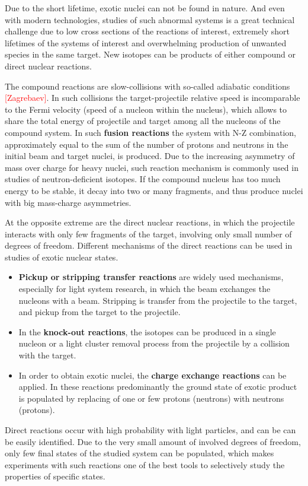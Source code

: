 Due to the short lifetime, exotic nuclei can not be found in nature.
And even with modern technologies, studies of such abnormal systems is a great technical challenge due to low cross sections of the reactions of interest, extremely short lifetimes of the systems of interest and overwhelming production of unwanted species in the same target.
New isotopes can be products of either compound or direct nuclear reactions.

The compound reactions are slow-collisions with so-called adiabatic conditions \textcolor{red}{[Zagrebaev]}.
In such collisions the target-projectile relative speed is incomparable to the Fermi velocity (speed of a nucleon within the nucleus), which allows to share the total energy of projectile and target among all the nucleons of the compound system.
In such \textbf{fusion reactions} the system with N-Z combination, approximately equal to the sum of the number of protons and neutrons in the initial beam and target nuclei, is produced.
Due to the increasing asymmetry of mass over charge for heavy nuclei, such reaction mechanism is commonly used in studies of neutron-deficient isotopes.
If the compound nucleus has too much energy to be stable, it decay into two or many fragments, and thus produce nuclei with big mass-charge asymmetries.

At the opposite extreme are the direct nuclear reactions, in which the projectile interacts with only few fragments of the target, involving only small number of degrees of freedom.
Different mechanisms of the direct reactions can be used in studies of exotic nuclear states. 

\begin{itemize}
	
	\item 
	\textbf{Pickup or stripping transfer reactions} are widely used mechanisms, especially for light system research, in which the beam exchanges the nucleons with a beam. 
	Stripping is transfer from the projectile to the target, and pickup from the target to the projectile.
	
	\item
	In the \textbf{knock-out reactions}, the isotopes can be produced in a single nucleon or a light cluster removal process from the projectile by a collision with the target.
	
	\item
	In order to obtain exotic nuclei, the \textbf{charge exchange reactions} can be applied.
	In these reactions predominantly  the ground state of exotic product is populated by replacing of one or few protons (neutrons) with neutrons (protons).
	
	
\end{itemize}	
Direct reactions occur with high probability with light particles, and can be can be easily identified.
Due to the very small amount of involved degrees of freedom, only few final states of the studied system can be populated, which makes experiments with such reactions one of the best tools to selectively study the properties of specific states.


